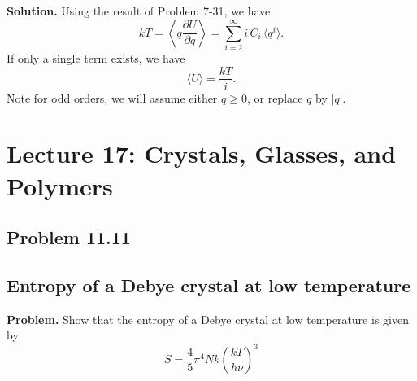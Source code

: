 \documentclass[twocolumn, 10pt]{article}
\numberwithin{equation}{section}
\newenvironment{problem}
{\par\medskip\sffamily \color{problue}
  \textbf{Problem. }\ignorespaces}
{\medskip}
\newenvironment{solution}
{\par\medskip
  \textbf{Solution. }\ignorespaces}
{\medskip}
\begin{document}
\begin{solution}
Using the result of Problem 7-31, we have
$$
kT
=
\left\langle
  q \frac{ \partial U } { \partial q }
\right\rangle
=
\sum_{i = 2}^\infty
  i \, C_i \, \langle q^i \rangle
.
$$
If only a single term exists, we have
$$
  \langle U \rangle = \frac{kT}{i}.
$$
Note for odd orders, we will assume either $q \ge 0$,
or replace $q$ by $|q|$.
\end{solution}

\section{Lecture 17: Crystals, Glasses, and Polymers}

\subsection{Problem 11.11}

\subsection{Entropy of a Debye crystal at low temperature}
\begin{problem}
  Show that the entropy of a Debye crystal at low
  temperature is given by
  $$
  S = \frac{4}{5} \pi^4 N k \left(\frac{kT}{h\nu}\right)^3
  $$
\end{problem}
%
%
%
%
%
%
\end{document}
